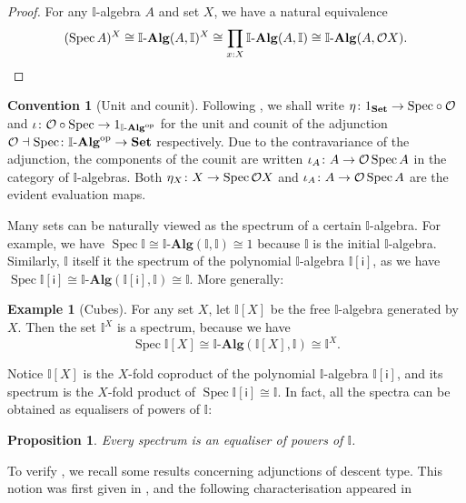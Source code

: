 \documentclass[a4paper,12pt]{amsart}
\newtheorem{proposition}[theorem]{Proposition}
\theoremstyle{definition}
\newtheorem{convention}[theorem]{Convention}
\newtheorem{example}[theorem]{Example}
\newcommand{\mb}[1]{\mathbf{#1}}
\newcommand{\mbb}[1]{\mathbb{#1}}
\newcommand{\I}{\mbb I}
\newcommand{\ms}[1]{\mathsf{#1}}
\newcommand{\Set}{\mb{Set}}
\newcommand{\alg}{\text{-}\mb{Alg}}
\newcommand{\op}{^{\mathrm{op}}}
\newcommand{\spec}{\operatorname{Spec}}
\begin{document}
\begin{proof}
  For any $\I$-algebra $A$ and set $X$, we have a natural equivalence 
  \[ (\spec A)^X \cong \I\alg(A,\I)^X \cong \prod_{x:X}\I\alg(A,\I)\cong \I\alg(A,\opens{X})\text{.} \qedhere\]
\end{proof}

\begin{convention}[Unit and counit]
  Following \citet{Taylor2011}, we shall write $\eta\colon 1_{\Set}\to {\spec}\circ \opens$ and $\iota\colon \opens\circ\spec\to 1_{\I\alg\op}$ for the unit and counit of the adjunction $\opens\dashv \spec\colon \I\alg\op\to \Set$ respectively. Due to the contravariance of the adjunction, the components of the counit are written $\iota_A\colon A\to \opens\spec{A}$ in the category of $\I$-algebras. Both $\eta_X\colon X\to \spec\opens{X}$ and $\iota_A\colon A\to \opens\spec{A}$ are the evident evaluation maps.
\end{convention}

Many sets can be naturally viewed as the spectrum of a certain $\I$-algebra. For example, we have $\spec \I \cong \I\alg(\I,\I) \cong 1$ because  $\I$ is the initial $\I$-algebra. Similarly, $\I$ itself it the spectrum of the polynomial $\I$-algebra $\I[\ms{i}]$, as we have $\spec \I[\ms{i}] \cong \I\alg(\I[\ms{i}],\I) \cong \I$. More generally:

\begin{example}[Cubes]\label{exm:cubeaffine}
  For any set $X$, let $\I[X]$ be the free $\I$-algebra generated by $X$. Then the set $\I^X$ is a spectrum, because we have
  \[ \spec \I[X] \cong \I\alg(\I[X],\I) \cong \I^X\text{.} \]
\end{example}

Notice $\I[X]$ is the $X$-fold coproduct of the polynomial $\I$-algebra $\I[\ms{i}]$, and its spectrum is the $X$-fold product of $\spec\I[\ms{i}] \cong \I$. In fact, all the spectra can be obtained as equalisers of powers of $\I$:

\begin{proposition}\label{prop:spectra-are-powers-of-the-interval}
  Every spectrum is an equaliser of powers of $\I$. 
\end{proposition}

To verify , we recall some results concerning adjunctions of descent type. This notion was first given in \citet{BarrMichael1985Ttat}, and the following characterisation appeared in \citet{kelly1993adjunctions}
\end{document}
